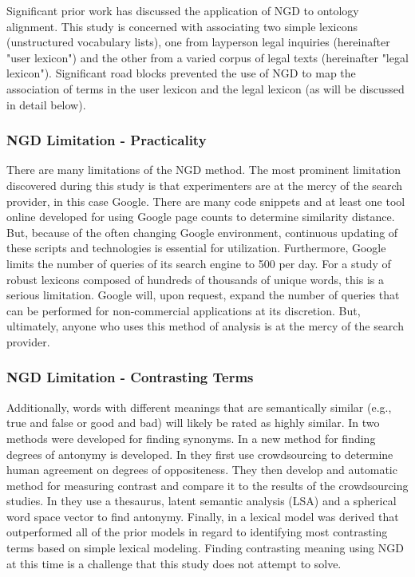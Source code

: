 \documentclass[11pt]{article}
\begin{document}
Significant prior work has discussed the application of NGD to ontology alignment.  This study is concerned with associating two simple lexicons (unstructured vocabulary lists), one from layperson legal inquiries (hereinafter "user lexicon") and the other from a varied corpus of legal texts (hereinafter "legal lexicon").  Significant road blocks prevented the use of NGD to map the association of terms in the user lexicon and the legal lexicon (as will be discussed in detail below).

\subsubsection{NGD Limitation - Practicality}
There are many limitations of the NGD method.  The most prominent limitation discovered during this study is that experimenters are at the mercy of the search provider, in this case Google.  There are many code snippets and at least one tool online developed for using Google page counts to determine similarity distance.  But, because of the often changing Google environment, continuous updating of these scripts and technologies is essential for utilization.  Furthermore, Google limits the number of queries of its search engine to 500 per day.  For a study of robust lexicons composed of hundreds of thousands of unique words, this is a serious limitation.  Google will, upon request, expand the number of queries that can be performed for non-commercial applications at its discretion.  But, ultimately, anyone who uses this method of analysis is at the mercy of the search provider.
  
\subsubsection{NGD Limitation - Contrasting Terms}
Additionally, words with different meanings that are semantically similar (e.g., true and false or good and bad) will likely be rated as highly similar.  In \cite{lin2003identifying} two methods were developed for finding synonyms.  In \cite{mohammad2008computing} a new method for finding degrees of antonymy is developed.  In \cite{mohammad2013computing} they first use crowdsourcing to determine human agreement on degrees of oppositeness.  They then develop and automatic method for measuring contrast and compare it to the results of the crowdsourcing studies.  In\cite{yih2012polarity} they use a thesaurus, latent semantic analysis (LSA) and a spherical word space vector to find antonymy.  Finally, in \cite{ChenZhigangLin2015} a lexical model was derived that outperformed all of the prior models in regard to identifying most contrasting terms based on simple lexical modeling.  Finding contrasting meaning using NGD at this time is a challenge that this study does not attempt to solve.  
\end{document}
